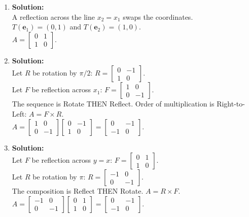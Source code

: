 \documentclass[12pt]{article}
\begin{document}
\begin{enumerate}
    \item \textbf{Solution:}\\
    A reflection across the line $x_2 = x_1$ swaps the coordinates. \\
    $T(\mathbf{e}_1) = (0, 1)$ and $T(\mathbf{e}_2) = (1, 0)$. \\
    $A = \begin{bmatrix} 0 & 1 \\ 1 & 0 \end{bmatrix}$.

    \item \textbf{Solution:}\\
    Let $R$ be rotation by $\pi/2$: $R = \begin{bmatrix} 0 & -1 \\ 1 & 0 \end{bmatrix}$. \\
    Let $F$ be reflection across $x_1$: $F = \begin{bmatrix} 1 & 0 \\ 0 & -1 \end{bmatrix}$. \\
    The sequence is Rotate THEN Reflect. Order of multiplication is Right-to-Left: $A = F \times R$. \\
    $A = \begin{bmatrix} 1 & 0 \\ 0 & -1 \end{bmatrix} \begin{bmatrix} 0 & -1 \\ 1 & 0 \end{bmatrix} = \begin{bmatrix} 0 & -1 \\ -1 & 0 \end{bmatrix}$.

    \item \textbf{Solution:}\\
    Let $F$ be reflection across $y = x$: $F = \begin{bmatrix} 0 & 1 \\ 1 & 0 \end{bmatrix}$. \\
    Let $R$ be rotation by $\pi$: $R = \begin{bmatrix} -1 & 0 \\ 0 & -1 \end{bmatrix}$. \\
    The composition is Reflect THEN Rotate. $A = R \times F$. \\
    $A = \begin{bmatrix} -1 & 0 \\ 0 & -1 \end{bmatrix} \begin{bmatrix} 0 & 1 \\ 1 & 0 \end{bmatrix} = \begin{bmatrix} 0 & -1 \\ -1 & 0 \end{bmatrix}$.


\end{enumerate}
\end{document}
